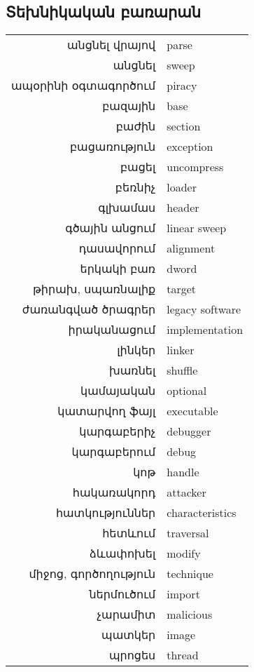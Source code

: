 \documentclass[12pt]{article}
\begin{document}
\begin{sloppypar}
\subsection{Տեխնիկական բառարան}

\begin{tabular}{rl}
անցնել վրայով&parse \\
անցնել&sweep \\
ապօրինի օգտագործում&piracy \\
բազային&base \\
բաժին&section \\
բացառություն&exception \\
բացել&uncompress \\
բեռնիչ&loader \\
գլխամաս&header \\
գծային անցում&linear sweep \\
դասավորում&alignment \\
երկակի բառ&dword \\
թիրախ, սպառնալիք&target \\
ժառանգված ծրագրեր&legacy software \\
իրականացում&implementation \\
լինկեր&linker \\
խառնել&shuffle \\
կամայական&optional \\
կատարվող ֆայլ&executable \\
կարգաբերիչ&debugger \\
կարգաբերում&debug \\
կոթ&handle \\
հակառակորդ&attacker \\
հատկություններ&characteristics \\
հետևում&traversal \\
ձևափոխել&modify \\
միջոց, գործողություն&technique \\
ներմուծում&import \\
չարամիտ&malicious \\
պատկեր&image \\
պրոցես&thread \\
\end{tabular}


\end{sloppypar}
\end{document}
